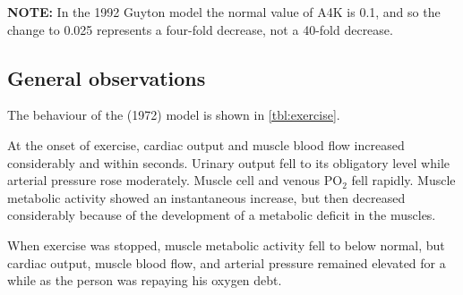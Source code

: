 \textbf{NOTE:} In the 1992 Guyton model the normal value of A4K is 0.1, and so the change to 0.025 represents a four-fold decrease, not a 40-fold decrease.

\subsection{General observations}
The behaviour of the (1972) model is shown in \autoref{tbl:exercise}.

At the onset of exercise, cardiac output and muscle blood flow increased considerably and within seconds.  Urinary output fell to its obligatory level while arterial pressure rose moderately.  Muscle cell and venous PO$_2$ fell rapidly. Muscle metabolic activity showed an instantaneous increase, but then decreased considerably because of the development of a metabolic deficit in the muscles.

When exercise was stopped, muscle metabolic activity fell to below normal, but cardiac output, muscle blood flow, and arterial pressure remained elevated for a while as the person was repaying his oxygen debt.
